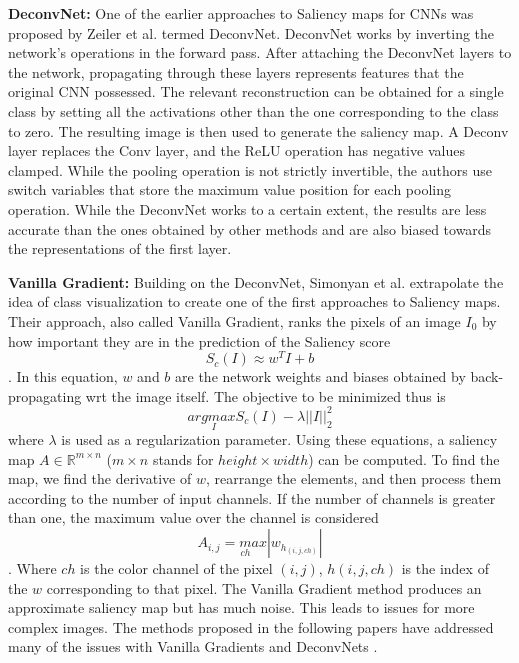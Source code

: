 \documentclass[a4paper,11pt,openright]{book}
\begin{document}
\textbf{DeconvNet: }
One of the earlier approaches to Saliency maps for CNNs was proposed by Zeiler et al. \cite{zeilerVisualizingUnderstandingConvolutional2013} termed DeconvNet. DeconvNet works by inverting the network's operations in the forward pass. After attaching the DeconvNet layers to the network, propagating through these layers represents features that the original CNN possessed. The relevant reconstruction can be obtained for a single class by setting all the activations other than the one corresponding to the class to zero. The resulting image is then used to generate the saliency map. A Deconv layer replaces the Conv layer, and the ReLU operation has negative values clamped. While the pooling operation is not strictly invertible, the authors use switch variables that store the maximum value position for each pooling operation. While the DeconvNet works to a certain extent, the results are less accurate than the ones obtained by other methods and are also biased towards the representations of the first layer.

\textbf{Vanilla Gradient: }
Building on the DeconvNet, Simonyan et al. \cite{simonyanDeepConvolutionalNetworks2014} extrapolate the idea of class visualization to create one of the first approaches to Saliency maps. Their approach, also called Vanilla Gradient, ranks the pixels of an image $I_{0}$ by how important they are in the prediction of the Saliency score $$S_{c}(I) \approx w^{T}I + b$$. In this equation, $w$ and $b$ are the network weights and biases obtained by back-propagating wrt the image itself. The objective to be minimized thus is $$arg \underset{I}max S_{c}(I) - \lambda||I||^{2}_{2}$$ where $\lambda$ is used as a regularization parameter. Using these equations, a saliency map $A \in \mathbb{R}^{m \times n}$ ($m \times n$ stands for $height \times width$) can be computed. To find the map, we find the derivative of $w$, rearrange the elements, and then process them according to the number of input channels. If the number of channels is greater than one, the maximum value over the channel is considered $$A_{i,j}= \underset{ch}max |w_{h_{(i,j, ch)}}|$$. Where $ch$ is the color channel of the pixel $(i,j)$, $h(i,j, ch)$ is the index of the $w$ corresponding to that pixel. The Vanilla Gradient method produces an approximate saliency map but has much noise. This leads to issues for more complex images. The methods proposed in the following papers have addressed many of the issues with Vanilla Gradients and DeconvNets \cite{zeilerVisualizingUnderstandingConvolutional2013}.
\end{document}
